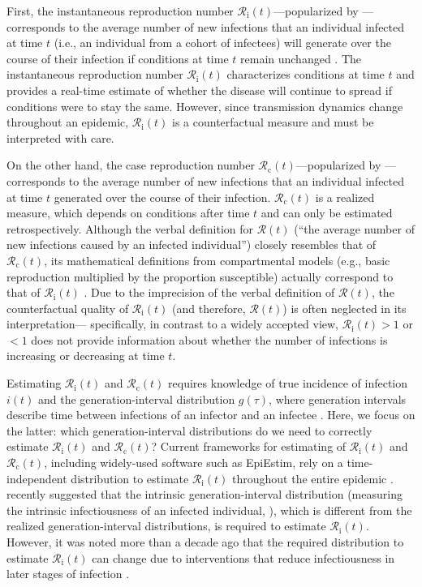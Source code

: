 \documentclass[12pt]{article}
\newcommand{\Rx}[1]{\ensuremath{{\mathcal R}_{#1}}\xspace}
\newcommand{\Rc}{\Rx{\mathrm{c}}}
\newcommand{\Ri}{\Rx{\mathrm{i}}}
\newcommand{\RR}{\ensuremath{{\mathcal R}}\xspace}
\begin{document}
First, the instantaneous reproduction number $\Ri(t)$---popularized by \cite{cori2013new}---corresponds to the average number of new infections that an individual infected at time $t$ (i.e., an individual from a cohort of infectees) will generate over the course of their infection if conditions at time $t$ remain unchanged \citep{fraser2007estimating}.
The instantaneous reproduction number $\Ri(t)$ characterizes conditions at time $t$ and provides a real-time estimate of whether the disease will continue to spread if conditions were to stay the same.
However, since transmission dynamics change throughout an epidemic, $\Ri(t)$ is a counterfactual measure and must be interpreted with care.

On the other hand, the case reproduction number $\Rc(t)$---popularized by \cite{wallinga2004different}---corresponds to the average number of new infections that an individual infected at time $t$ generated over the course of their infection.
$\Rc(t)$ is a realized measure, which depends on conditions after time $t$ and can only be estimated retrospectively.
Although the verbal definition for $\RR(t)$ (``the average number of new infections caused by an infected individual'') closely resembles that of $\Rc(t)$, its mathematical definitions from compartmental models (e.g., basic reproduction multiplied by the proportion susceptible) actually correspond to that of $\Ri(t)$ \citep{gostic2020practical}.
Due to the imprecision of the verbal definition of $\RR(t)$, the counterfactual quality of $\Ri(t)$ (and therefore, $\RR(t)$) is often neglected in its interpretation---
specifically, in contrast to a widely accepted view, $\Ri(t) > 1$ or $<1$ does not provide information about whether the number of infections is increasing or decreasing at time $t$.

Estimating $\Ri(t)$ and $\Rc(t)$ requires knowledge of true incidence of infection $i(t)$ and the generation-interval distribution $g(\tau)$, where generation intervals describe time between infections of an infector and an infectee \citep{svensson2007note}.
Here, we focus on the latter: which generation-interval distributions do we need to correctly estimate $\Ri(t)$ and $\Rc(t)$?
Current frameworks for estimating of $\Ri(t)$ and $\Rc(t)$, including widely-used software such as EpiEstim, rely on a time-independent distribution to estimate $\Ri(t)$ throughout the entire epidemic \citep{cori2013new}.
\cite{gostic2020practical} recently suggested that the intrinsic generation-interval distribution (measuring the intrinsic infectiousness of an infected individual, \cite{champredon2015intrinsic}), which is different from the realized generation-interval distributions, is required to estimate $\Ri(t)$.
However, it was noted more than a decade ago that the required distribution to estimate $\Ri(t)$ can change due to interventions that reduce infectiousness in later stages of infection \citep{fraser2007estimating}.
\end{document}
